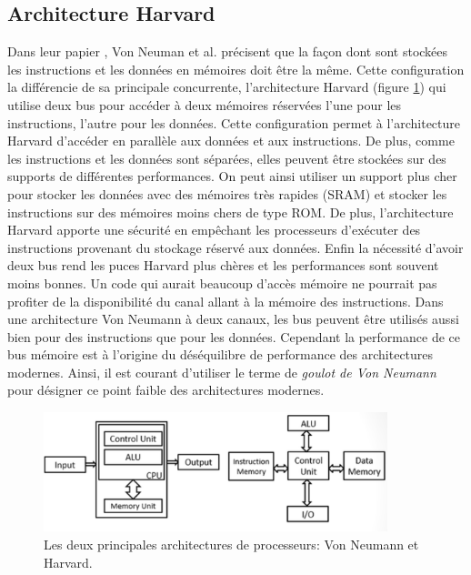 \subsection{Architecture Harvard}

Dans leur papier \cite{238389}, Von Neuman et al. précisent que la façon dont sont stockées les instructions et les données en mémoires doit être la même. Cette configuration la différencie de sa principale concurrente, l'architecture  Harvard (figure \ref{pic_neumannHarvard}) qui utilise deux bus pour accéder à deux mémoires réservées l'une pour les instructions, l'autre pour les données. 
Cette configuration permet à l'architecture Harvard d'accéder en parallèle aux données et aux instructions. De plus, comme les instructions et les données sont séparées, elles peuvent être stockées sur des supports de différentes performances. On peut ainsi utiliser un support plus cher pour stocker les données avec des mémoires très rapides (SRAM) et stocker les instructions sur des mémoires moins chers de type ROM. De plus, l’architecture Harvard apporte une sécurité en empêchant les processeurs d’exécuter des instructions provenant du stockage réservé aux données. Enfin la nécessité d’avoir deux bus rend les puces Harvard plus chères et les performances sont souvent moins bonnes. Un code qui aurait beaucoup d’accès mémoire ne pourrait pas profiter de la disponibilité du canal allant à la mémoire des instructions. Dans une architecture Von Neumann à deux canaux, les bus peuvent être utilisés aussi bien pour des instructions que pour les données. Cependant la performance de ce bus mémoire est à l’origine du déséquilibre de performance des architectures modernes. Ainsi, il est courant d’utiliser le terme de \textit{goulot de Von Neumann} pour désigner ce point faible des architectures modernes.

\begin{figure}
    \center
    \includegraphics[width=10cm]{images/Chapitre1/neumannHarvard.png}
    \caption{\label{pic_neumannHarvard} Les deux principales architectures de processeurs: Von Neumann et Harvard. }
\end{figure}